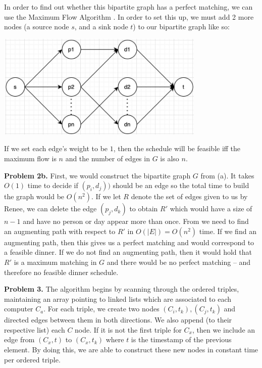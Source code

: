 \documentclass{article}
\begin{document}
In order to find out whether this bipartite graph has a perfect matching, we can use the Maximum Flow Algorithm \cite{website:2}. In order to set this up, we must add 2 more nodes (a source node $s$, and a sink node $t$) to our bipartite graph like so:

\begin{center}
    \includegraphics[width=10cm, height=5cm]{images/maximum-flow-graph.jpg}
\end{center}

If we set each edge's weight to be $1$, then the schedule will be feasible iff the maximum flow is $n$ and the number of edges in $G$ is also $n$.

\hfill

\textbf{Problem 2b.} First, we would construct the bipartite graph $G$ from (a). It takes $O(1)$ time to decide if $(p_i, d_j))$ should be an edge so the total time to build the graph would be $O(n^2)$. If we let $R$ denote the set of edges given to us by Renee, we can delete the edge $(p_j, d_k)$ to obtain $R'$ which would have a size of $n-1$ and have no person or day appear more than once. From \cite{website:3} we need to find an augmenting path with respect to $R'$ in $O(|E|) = O(n^2)$ time. If we find an augmenting path, then this gives us a perfect matching and would correspond to a feasible dinner. If we do not find an augmenting path, then it would hold that $R'$ is a maximum matching in $G$ and there would be no perfect matching -- and therefore no feasible dinner schedule. 

\hfill

\textbf{Problem 3.} The algorithm \cite{website:3} begins by scanning through the ordered triples, maintaining an array pointing to linked lists which are associated to each computer $C_a$. For each triple, we create two nodes $(C_i, t_k), (C_j, t_k)$ and directed edges between them in both directions. We also append (to their respective list) each $C$ node. If it is not the first triple for $C_x$, then we include an edge from $(C_x, t)$ to $(C_x, t_k)$ where $t$ is the timestamp of the previous element. By doing this, we are able to construct these new nodes in constant time per ordered triple.
\end{document}
